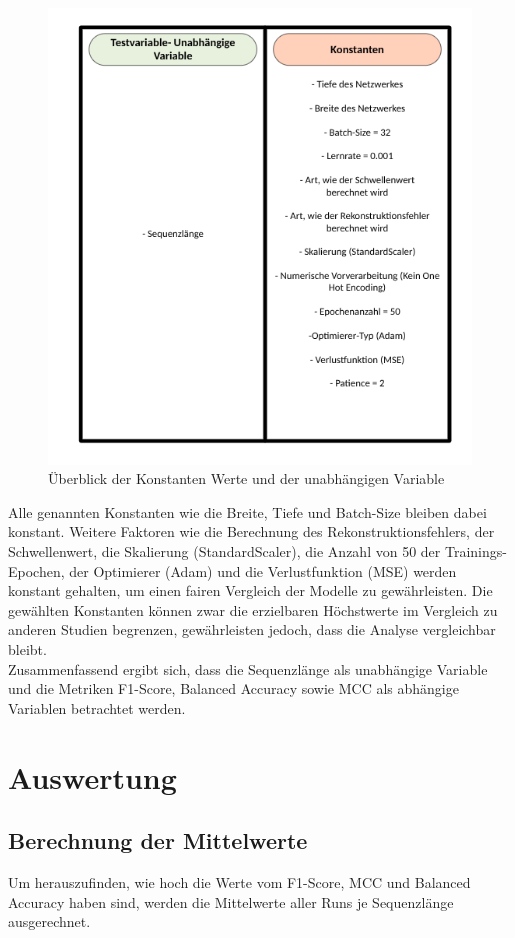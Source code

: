 \documentclass[a4paper,12pt]{article}
\begin{document}
	\begin{figure}[H]
		\centering
		\includegraphics[width=0.7\linewidth]{Bilder/variablen}
		\caption{Überblick der Konstanten Werte und der unabhängigen Variable}
		\label{fig:variablen}
	\end{figure}

	Alle genannten Konstanten wie die Breite, Tiefe und Batch-Size bleiben dabei konstant. Weitere Faktoren wie die Berechnung des Rekonstruktionsfehlers, der Schwellenwert, die Skalierung (StandardScaler), die Anzahl von 50 der Trainings-Epochen, der Optimierer (Adam) und die Verlustfunktion (MSE) werden konstant gehalten, um einen fairen Vergleich der Modelle zu gewährleisten. Die gewählten Konstanten können zwar die erzielbaren Höchstwerte im Vergleich zu anderen Studien begrenzen, gewährleisten jedoch, dass die Analyse vergleichbar bleibt.
	\\[0.5em]
	Zusammenfassend ergibt sich, dass die Sequenzlänge als unabhängige Variable und die Metriken F1-Score, Balanced Accuracy sowie MCC als abhängige Variablen betrachtet werden.
	
	\section{Auswertung}
	\subsection{Berechnung der Mittelwerte}
	
	Um herauszufinden, wie hoch die Werte vom F1-Score, MCC und Balanced Accuracy haben sind, werden die Mittelwerte aller Runs je Sequenzlänge ausgerechnet.
	
\end{document}
